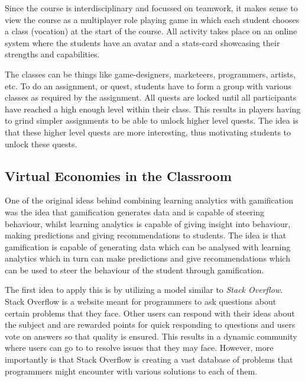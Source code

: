 \documentclass[11pt]{article}
\begin{document}
Since the course is interdisciplinary and focussed on teamwork, it makes sense to view the course as a multiplayer role playing game in which each student chooses a class (vocation) at the start of the course. All activity takes place on an online system where the students have an avatar and a stats-card showcasing their strengths and capabilities.

The classes can be things like game-designers, marketeers, programmers, artists, etc. To do an assignment, or quest, students have to form a group with various classes as required by the assignment. All quests are locked until all participants have reached a high enough level within their class. This results in players having to grind simpler assignments to be able to unlock higher level quests. The idea is that these higher level quests are more interesting, thus motivating students to unlock these quests. 

\subsection{Virtual Economies in the Classroom}

One of the original ideas behind combining learning analytics with gamification was the idea that gamification generates data and is capable of steering behaviour, whilst learning analytics is capable of giving insight into behaviour, making predictions and giving recommendations to students. The idea is that gamification is capable of generating data which can be analysed with learning analytics which in turn can make predictions and give recommendations which can be used to steer the behaviour of the student through gamification. 

The first idea to apply this is by utilizing a model similar to \emph{Stack Overflow}. Stack Overflow is a website meant for programmers to ask questions about certain problems that they face. Other users can respond with their ideas about the subject and are rewarded points for quick responding to questions and users vote on answers so that quality is ensured. This results in a dynamic community where users can go to to resolve issues that they may face. However, more importantly is that Stack Overflow is creating a vast database of problems that programmers might encounter with various solutions to each of them. 
\end{document}

